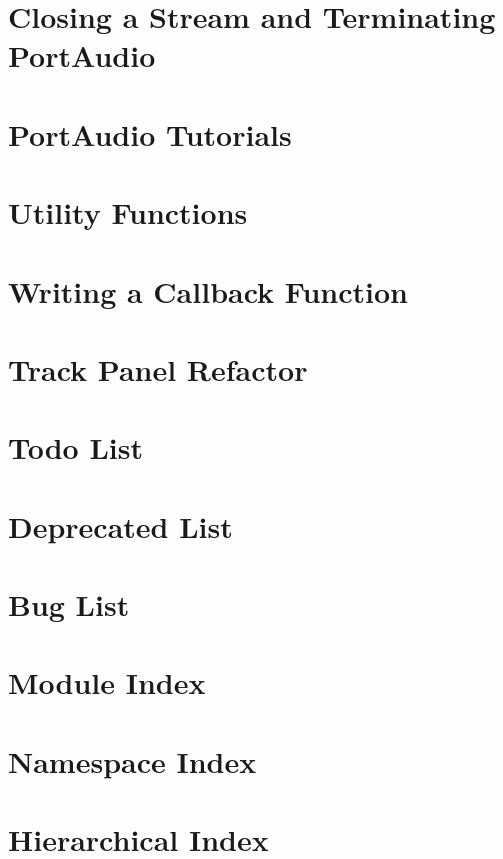 \documentclass[twoside]{book}
\newcommand{\+}{\discretionary{\mbox{\scriptsize$\hookleftarrow$}}{}{}}
\begin{document}
\chapter{Closing a Stream and Terminating Port\+Audio}
\label{terminating_portaudio}
\hypertarget{terminating_portaudio}{}

\chapter{Port\+Audio Tutorials}
\label{tutorial_start}
\hypertarget{tutorial_start}{}

\chapter{Utility Functions}
\label{utility_functions}
\hypertarget{utility_functions}{}

\chapter{Writing a Callback Function}
\label{writing_a_callback}
\hypertarget{writing_a_callback}{}

\chapter{Track Panel Refactor}
\label{TrackPanelRefactor}
\hypertarget{TrackPanelRefactor}{}

\chapter{Todo List}
\label{todo}
\hypertarget{todo}{}

\chapter{Deprecated List}
\label{deprecated}
\hypertarget{deprecated}{}

\chapter{Bug List}
\label{bug}
\hypertarget{bug}{}

\chapter{Module Index}

\chapter{Namespace Index}

\chapter{Hierarchical Index}

\end{document}

